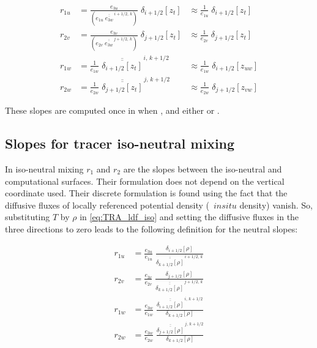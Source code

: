 \documentclass[../main/NEMO_manual]{subfiles}
\begin{document}
\begin{equation}
  \label{eq:LDF_slp_geo}
  \begin{aligned}
    r_{1u} &= \frac{e_{3u}}{ \left( e_{1u}\;\overline{\overline{e_{3w}}}^{\,i+1/2,\,k} \right)}
    \;\delta_{i+1/2}[z_t]
    &\approx \frac{1}{e_{1u}}\; \delta_{i+1/2}[z_t] \ \ \ \\
    r_{2v} &= \frac{e_{3v}}{\left( e_{2v}\;\overline{\overline{e_{3w}}}^{\,j+1/2,\,k} \right)}
    \;\delta_{j+1/2} [z_t]
    &\approx \frac{1}{e_{2v}}\; \delta_{j+1/2}[z_t] \ \ \ \\
    r_{1w} &= \frac{1}{e_{1w}}\;\overline{\overline{\delta_{i+1/2}[z_t]}}^{\,i,\,k+1/2}
    &\approx \frac{1}{e_{1w}}\; \delta_{i+1/2}[z_{uw}]  \\
    r_{2w} &= \frac{1}{e_{2w}}\;\overline{\overline{\delta_{j+1/2}[z_t]}}^{\,j,\,k+1/2}
    &\approx \frac{1}{e_{2w}}\; \delta_{j+1/2}[z_{vw}]
  \end{aligned}
\end{equation}


These slopes are computed once in  when ,
and either  or .

\subsection{Slopes for tracer iso-neutral mixing}
\label{subsec:LDF_slp_iso}

In iso-neutral mixing  $r_1$ and $r_2$ are the slopes between the iso-neutral and computational surfaces.
Their formulation does not depend on the vertical coordinate used.
Their discrete formulation is found using the fact that the diffusive fluxes of
locally referenced potential density (\ie\ $in situ$ density) vanish.
So, substituting $T$ by $\rho$ in \autoref{eq:TRA_ldf_iso} and setting the diffusive fluxes in
the three directions to zero leads to the following definition for the neutral slopes:

\begin{equation}
  \label{eq:LDF_slp_iso}
  \begin{split}
    r_{1u} &= \frac{e_{3u}}{e_{1u}}\; \frac{\delta_{i+1/2}[\rho]}
    {\overline{\overline{\delta_{k+1/2}[\rho]}}^{\,i+1/2,\,k}} \\
    r_{2v} &= \frac{e_{3v}}{e_{2v}}\; \frac{\delta_{j+1/2}\left[\rho \right]}
    {\overline{\overline{\delta_{k+1/2}[\rho]}}^{\,j+1/2,\,k}} \\
    r_{1w} &= \frac{e_{3w}}{e_{1w}}\;
    \frac{\overline{\overline{\delta_{i+1/2}[\rho]}}^{\,i,\,k+1/2}}
    {\delta_{k+1/2}[\rho]} \\
    r_{2w} &= \frac{e_{3w}}{e_{2w}}\;
    \frac{\overline{\overline{\delta_{j+1/2}[\rho]}}^{\,j,\,k+1/2}}
    {\delta_{k+1/2}[\rho]}
  \end{split}
\end{equation}
\end{document}

